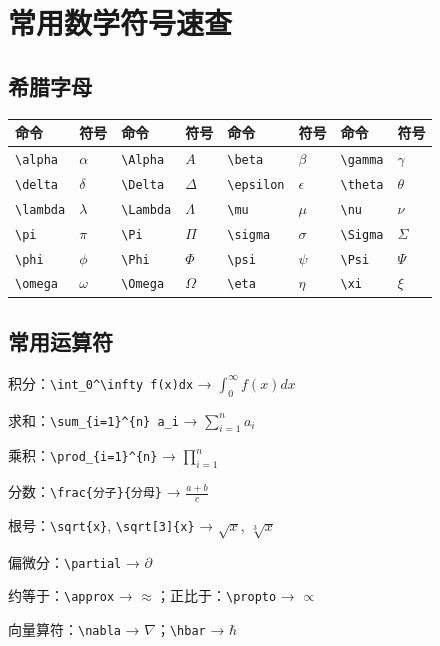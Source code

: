 \section{常用数学符号速查}

\subsection{希腊字母}

\begin{table}[H]
\centering
{}
\begin{tabular}{llll|llll}
\hline
命令 & 符号 & 命令 & 符号 & 命令 & 符号 & 命令 & 符号 \\
\hline
\verb|\alpha|   & $\alpha$   & \verb|\Alpha|   & $A$       & \verb|\beta|    & $\beta$    & \verb|\gamma|   & $\gamma$ \\
\verb|\delta|   & $\delta$   & \verb|\Delta|   & $\Delta$  & \verb|\epsilon| & $\epsilon$ & \verb|\theta|   & $\theta$ \\
\verb|\lambda|  & $\lambda$  & \verb|\Lambda|  & $\Lambda$ & \verb|\mu|      & $\mu$      & \verb|\nu|      & $\nu$ \\
\verb|\pi|      & $\pi$      & \verb|\Pi|      & $\Pi$     & \verb|\sigma|   & $\sigma$   & \verb|\Sigma|   & $\Sigma$ \\
\verb|\phi|     & $\phi$     & \verb|\Phi|     & $\Phi$    & \verb|\psi|     & $\psi$     & \verb|\Psi|     & $\Psi$ \\
\verb|\omega|   & $\omega$   & \verb|\Omega|   & $\Omega$  & \verb|\eta|     & $\eta$     & \verb|\xi|      & $\xi$ \\
\hline
\end{tabular}
\end{table}

\subsection{常用运算符}

\begin{compactitem}
    \item 积分：\verb|\int_0^\infty f(x)dx| → $\int_0^\infty f(x)dx$
    \item 求和：\verb|\sum_{i=1}^{n} a_i| → $\sum_{i=1}^{n} a_i$
    \item 乘积：\verb|\prod_{i=1}^{n}| → $\prod_{i=1}^{n}$
    \item 分数：\verb|\frac{分子}{分母}| → $\frac{a+b}{c}$
    \item 根号：\verb|\sqrt{x}|, \verb|\sqrt[3]{x}| → $\sqrt{x}$, $\sqrt[3]{x}$
    \item 偏微分：\verb|\partial| → $\partial$
    \item 约等于：\verb|\approx| → $\approx$；正比于：\verb|\propto| → $\propto$
    \item 向量算符：\verb|\nabla| → $\nabla$；\verb|\hbar| → $\hbar$
\end{compactitem}

